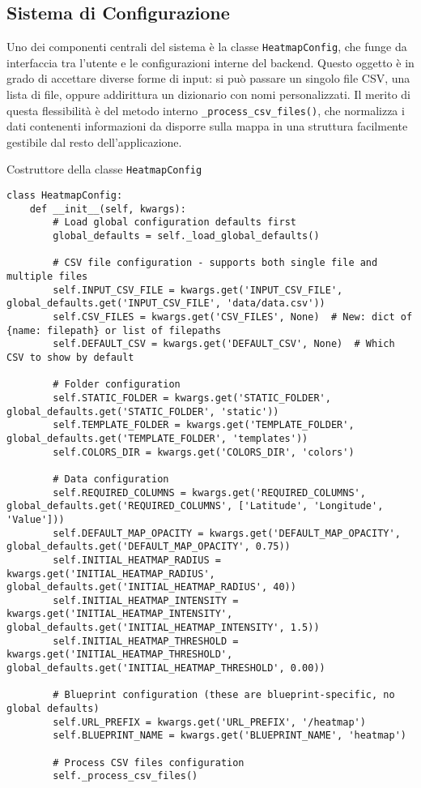 \subsection{Sistema di Configurazione}

Uno dei componenti centrali del sistema è la classe \texttt{HeatmapConfig}, che funge da interfaccia tra l'utente e le configurazioni interne del backend. Questo oggetto è in grado di accettare diverse forme di input: si può passare un singolo file CSV, una lista di file, oppure addirittura un dizionario con nomi personalizzati. Il merito di questa flessibilità è del metodo interno \texttt{\_process\_csv\_files()}, che normalizza i dati contenenti informazioni da disporre sulla mappa in una struttura facilmente gestibile dal resto dell'applicazione.

\begin{listing}[H]
\caption{Costruttore della classe \texttt{HeatmapConfig}}
\label{lst:heatmap_config}
\begin{verbatim}
class HeatmapConfig:
    def __init__(self, kwargs):
        # Load global configuration defaults first
        global_defaults = self._load_global_defaults()
        
        # CSV file configuration - supports both single file and multiple files
        self.INPUT_CSV_FILE = kwargs.get('INPUT_CSV_FILE', global_defaults.get('INPUT_CSV_FILE', 'data/data.csv'))
        self.CSV_FILES = kwargs.get('CSV_FILES', None)  # New: dict of {name: filepath} or list of filepaths
        self.DEFAULT_CSV = kwargs.get('DEFAULT_CSV', None)  # Which CSV to show by default
        
        # Folder configuration
        self.STATIC_FOLDER = kwargs.get('STATIC_FOLDER', global_defaults.get('STATIC_FOLDER', 'static'))
        self.TEMPLATE_FOLDER = kwargs.get('TEMPLATE_FOLDER', global_defaults.get('TEMPLATE_FOLDER', 'templates'))
        self.COLORS_DIR = kwargs.get('COLORS_DIR', 'colors')
        
        # Data configuration
        self.REQUIRED_COLUMNS = kwargs.get('REQUIRED_COLUMNS', global_defaults.get('REQUIRED_COLUMNS', ['Latitude', 'Longitude', 'Value']))
        self.DEFAULT_MAP_OPACITY = kwargs.get('DEFAULT_MAP_OPACITY', global_defaults.get('DEFAULT_MAP_OPACITY', 0.75))
        self.INITIAL_HEATMAP_RADIUS = kwargs.get('INITIAL_HEATMAP_RADIUS', global_defaults.get('INITIAL_HEATMAP_RADIUS', 40))
        self.INITIAL_HEATMAP_INTENSITY = kwargs.get('INITIAL_HEATMAP_INTENSITY', global_defaults.get('INITIAL_HEATMAP_INTENSITY', 1.5))
        self.INITIAL_HEATMAP_THRESHOLD = kwargs.get('INITIAL_HEATMAP_THRESHOLD', global_defaults.get('INITIAL_HEATMAP_THRESHOLD', 0.00))
        
        # Blueprint configuration (these are blueprint-specific, no global defaults)
        self.URL_PREFIX = kwargs.get('URL_PREFIX', '/heatmap')
        self.BLUEPRINT_NAME = kwargs.get('BLUEPRINT_NAME', 'heatmap')
        
        # Process CSV files configuration
        self._process_csv_files()
\end{verbatim}
\end{listing}

